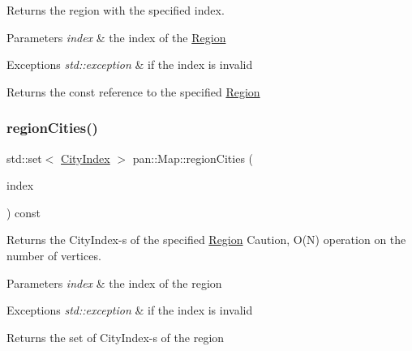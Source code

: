 Returns the region with the specified index. 
\begin{DoxyParams}{Parameters}
{\em index} & the index of the \hyperlink{classpan_1_1_region}{Region} \\
\hline
\end{DoxyParams}

\begin{DoxyExceptions}{Exceptions}
{\em std\+::exception} & if the index is invalid \\
\hline
\end{DoxyExceptions}
\begin{DoxyReturn}{Returns}
the const reference to the specified \hyperlink{classpan_1_1_region}{Region} 
\end{DoxyReturn}
\mbox{\label{classpan_1_1_map_a6c28ef7bcc328fa4260309aa14f50f8a}} 
\subsubsection{\texorpdfstring{region\+Cities()}{regionCities()}}
{\footnotesize\ttfamily std\+::set$<$ \hyperlink{namespacepan_afaed28aa6603153dcc062a028602d697}{City\+Index} $>$ pan\+::\+Map\+::region\+Cities (\begin{DoxyParamCaption}\item[{\hyperlink{namespacepan_a648dcc32a76222a9e4cd4a3e80bda642}{Region\+Index}}]{index }\end{DoxyParamCaption}) const}

Returns the City\+Index-\/s of the specified \hyperlink{classpan_1_1_region}{Region} Caution, O(\+N) operation on the number of vertices. 
\begin{DoxyParams}{Parameters}
{\em index} & the index of the region \\
\hline
\end{DoxyParams}

\begin{DoxyExceptions}{Exceptions}
{\em std\+::exception} & if the index is invalid \\
\hline
\end{DoxyExceptions}
\begin{DoxyReturn}{Returns}
the set of City\+Index-\/s of the region 
\end{DoxyReturn}
\mbox{\label{classpan_1_1_map_af477415a73c3e1fed14f1bd3753da6b1}} 
